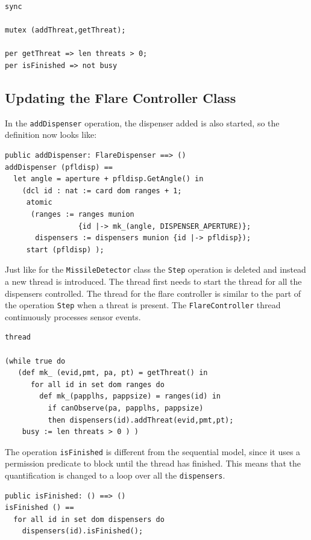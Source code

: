 \documentclass{overturerepchap}
\begin{document}
\begin{lstlisting}
sync

mutex (addThreat,getThreat);

per getThreat => len threats > 0;
per isFinished => not busy
\end{lstlisting}

\subsection{Updating the Flare Controller Class}

In the \texttt{addDispenser} operation, the dispenser added is also started,
so the definition now looks like:

\begin{lstlisting}
public addDispenser: FlareDispenser ==> ()
addDispenser (pfldisp) ==
  let angle = aperture + pfldisp.GetAngle() in
    (dcl id : nat := card dom ranges + 1;
     atomic
      (ranges := ranges munion 
                 {id |-> mk_(angle, DISPENSER_APERTURE)};
       dispensers := dispensers munion {id |-> pfldisp});
     start (pfldisp) );
\end{lstlisting}

Just like for the \texttt{MissileDetector} class the \texttt{Step} operation
is deleted and instead a new thread is introduced. The thread first needs
to start the thread for all the dispensers controlled.
The thread for the flare controller is similar to the part of the operation
\texttt{Step} when a threat is present. The \texttt{FlareController} thread
continuously processes sensor events. 

\begin{lstlisting}
thread

(while true do
   (def mk_ (evid,pmt, pa, pt) = getThreat() in
      for all id in set dom ranges do
        def mk_(papplhs, pappsize) = ranges(id) in
          if canObserve(pa, papplhs, pappsize)
          then dispensers(id).addThreat(evid,pmt,pt);
    busy := len threats > 0 ) )
\end{lstlisting}

The operation \texttt{isFinished} is different from the sequential
model, since it uses a permission predicate to block until the thread
has finished. This means that the {\bf{}} quantification is
changed to a loop over all the \texttt{dispensers}.

\begin{lstlisting}
public isFinished: () ==> ()
isFinished () ==
  for all id in set dom dispensers do
    dispensers(id).isFinished();
\end{lstlisting}
\end{document}
